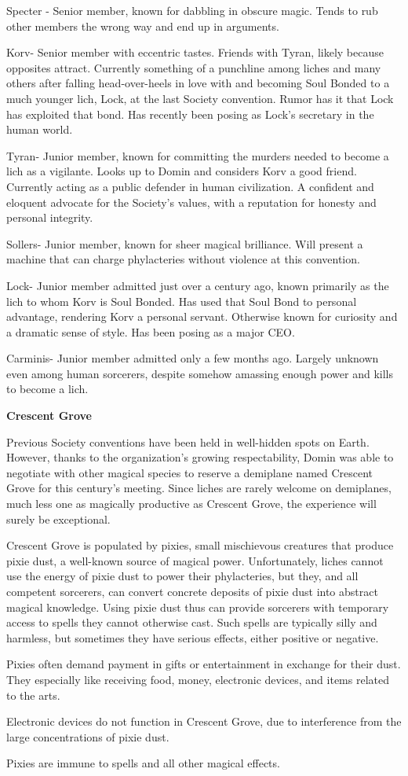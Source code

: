 \documentclass[blue]{Sel}
\begin{document}
Specter - Senior member, known for dabbling in obscure magic. Tends to rub other members the wrong way and end up in arguments.

Korv- Senior member with eccentric tastes. Friends with Tyran, likely because opposites attract. Currently something of a punchline among liches and many others after falling head-over-heels in love with and becoming Soul Bonded to a much younger lich, Lock, at the last Society convention. Rumor has it that Lock has exploited that bond. Has recently been posing as Lock's secretary in the human world.

Tyran- Junior member, known for committing the murders needed to become a lich as a vigilante. Looks up to Domin and considers Korv a good friend. Currently acting as a public defender in human civilization. A confident and eloquent advocate for the Society's values, with a reputation for honesty and personal integrity.

Sollers- Junior member, known for sheer magical brilliance. Will present a machine that can charge phylacteries without violence at this convention. 

Lock- Junior member admitted just over a century ago, known primarily as the lich to whom Korv is Soul Bonded. Has used that Soul Bond to personal advantage, rendering Korv a personal servant. Otherwise known for curiosity and a dramatic sense of style. Has been posing as a major CEO.

Carminis- Junior member admitted only a few months ago. Largely unknown even among human sorcerers, despite somehow amassing enough power and kills to become a lich.


\textbf{Crescent Grove}

Previous Society conventions have been held in well-hidden spots on Earth. However, thanks to the organization's growing respectability, Domin was able to negotiate with other magical species to reserve a demiplane named Crescent Grove for this century's meeting. Since liches are rarely welcome on demiplanes, much less one as magically productive as Crescent Grove, the experience will surely be exceptional.

Crescent Grove is populated by pixies, small mischievous creatures that produce pixie dust, a well-known source of magical power. Unfortunately, liches cannot use the energy of pixie dust to power their phylacteries, but they, and all competent sorcerers, can convert concrete deposits of pixie dust into abstract magical knowledge. Using pixie dust thus can provide sorcerers with temporary access to spells they cannot otherwise cast. Such spells are typically silly and harmless, but sometimes they have serious effects, either positive or negative.

Pixies often demand payment in gifts or entertainment in exchange for their dust. They especially like receiving food, money, electronic devices, and items related to the arts.

Electronic devices do not function in Crescent Grove, due to interference from the large concentrations of pixie dust.

Pixies are immune to spells and all other magical effects.
\end{document}

